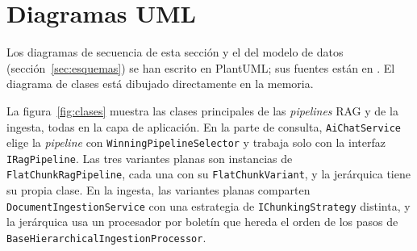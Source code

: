 \section{Diagramas UML}
\label{sec:uml}
Los diagramas de secuencia de esta sección y el del modelo de datos (sección~\ref{sec:esquemas}) se han escrito en PlantUML; sus fuentes están en . El diagrama de clases está dibujado directamente en la memoria.

La figura~\ref{fig:clases} muestra las clases principales de las \emph{pipelines} RAG y de la ingesta, todas en la capa de aplicación. En la parte de consulta, \texttt{AiChatService} elige la \emph{pipeline} con \texttt{Winning\-Pipeline\-Selector} y trabaja solo con la interfaz \texttt{IRagPipeline}. Las tres variantes planas son instancias de \texttt{FlatChunkRagPipeline}, cada una con su \texttt{FlatChunkVariant}, y la jerárquica tiene su propia clase. En la ingesta, las variantes planas comparten \texttt{Document\-Ingestion\-Service} con una estrategia de \texttt{IChunkingStrategy} distinta, y la jerárquica usa un procesador por boletín que hereda el orden de los pasos de \texttt{Base\-Hierarchical\-Ingestion\-Processor}.

